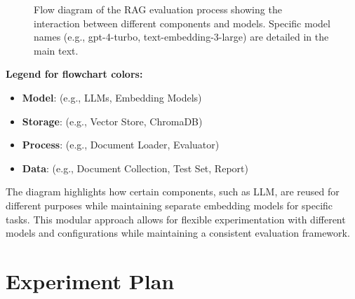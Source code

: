 \begin{figure}[htbp]
{
    }
    \caption{Flow diagram of the RAG evaluation process showing the interaction between different components and models. Specific model names (e.g., gpt-4-turbo, text-embedding-3-large) are detailed in the main text.}
    \label{fig:rag-flow}
\end{figure}

\begin{center}
\begin{minipage}{0.85\textwidth}
\textbf{Legend for flowchart colors:}
\begin{itemize}
    \item \colorbox{pink!20}{\strut\hspace{1.5em}} \textbf{Model}: (e.g., LLMs, Embedding Models)
    \item \colorbox{blue!20}{\strut\hspace{1.5em}} \textbf{Storage}: (e.g., Vector Store, ChromaDB)
    \item \colorbox{green!20}{\strut\hspace{1.5em}} \textbf{Process}: (e.g., Document Loader, Evaluator)
    \item \colorbox{red!20}{\strut\hspace{1.5em}} \textbf{Data}: (e.g., Document Collection, Test Set, Report)
\end{itemize}
\end{minipage}
\end{center}

The diagram highlights how certain components, such as LLM, are reused for different purposes while maintaining separate embedding models for specific tasks. This modular approach allows for flexible experimentation with different models and configurations while maintaining a consistent evaluation framework.

\section{Experiment Plan}

